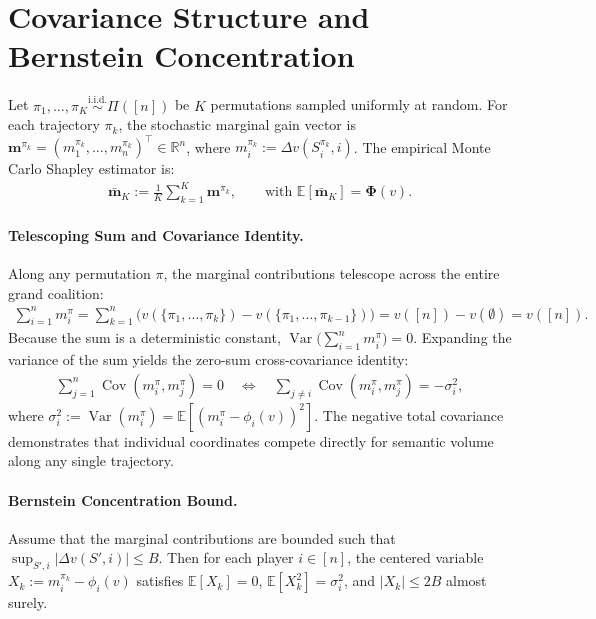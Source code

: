 
\section{Covariance Structure and Bernstein Concentration}
\label{app:bernstein_concentration}

Let $\pi_1, \dots, \pi_K \overset{\text{i.i.d.}}{\sim} \Pi([n])$ be $K$ permutations sampled uniformly at random. For each trajectory $\pi_k$, the stochastic marginal gain vector is $\mathbf{m}^{\pi_k} = (m_1^{\pi_k}, \dots, m_n^{\pi_k})^\top \in \mathbb{R}^n$, where $m_i^{\pi_k} := \Delta v(S_i^{\pi_k}, i)$. The empirical Monte Carlo Shapley estimator is:
\begin{align}
    \bar{\mathbf{m}}_K := \frac{1}{K} \sum_{k=1}^K \mathbf{m}^{\pi_k}, \qquad \text{with } \mathbb{E}[\bar{\mathbf{m}}_K] = \boldsymbol{\Phi}(v).
\end{align}

\paragraph{Telescoping Sum and Covariance Identity.}
Along any permutation $\pi$, the marginal contributions telescope across the entire grand coalition:
\begin{align}\label{eq:telescoping_sum}
    \sum_{i=1}^n m_i^\pi = \sum_{k=1}^n \Big( v(\{\pi_1, \dots, \pi_k\}) - v(\{\pi_1, \dots, \pi_{k-1}\}) \Big) = v([n]) - v(\emptyset) = v([n]).
\end{align}
Because the sum is a deterministic constant, $\operatorname{Var}\big(\sum_{i=1}^n m_i^\pi\big) = 0$. Expanding the variance of the sum yields the zero-sum cross-covariance identity:
\begin{align}\label{eq:zero_sum_cov}
    \sum_{j=1}^n \operatorname{Cov}(m_i^\pi, m_j^\pi) = 0 \quad \Longleftrightarrow \quad \sum_{j \neq i} \operatorname{Cov}(m_i^\pi, m_j^\pi) = -\sigma_i^2,
\end{align}
where $\sigma_i^2 := \operatorname{Var}(m_i^\pi) = \mathbb{E}[(m_i^\pi - \phi_i(v))^2]$. The negative total covariance demonstrates that individual coordinates compete directly for semantic volume along any single trajectory.

\paragraph{Bernstein Concentration Bound.}
Assume that the marginal contributions are bounded such that $\sup_{S', i} |\Delta v(S', i)| \le B$. Then for each player $i \in [n]$, the centered variable $X_k := m_i^{\pi_k} - \phi_i(v)$ satisfies $\mathbb{E}[X_k] = 0$, $\mathbb{E}[X_k^2] = \sigma_i^2$, and $|X_k| \le 2B$ almost surely.

